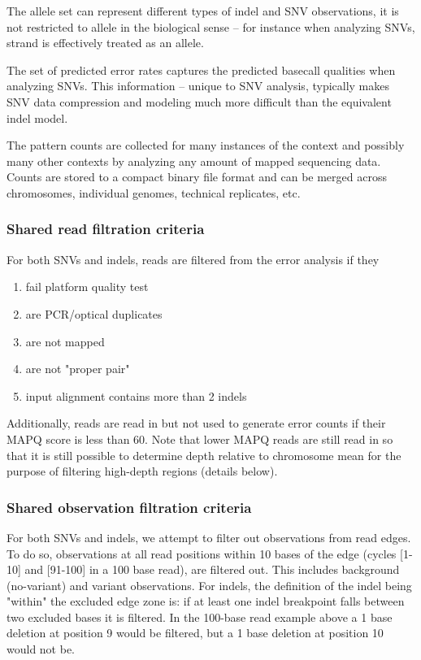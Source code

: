 \documentclass{article}
\begin{document}
The allele set can represent different types of indel and SNV observations, it is not restricted to allele in the biological sense -- for instance when analyzing SNVs, strand is effectively treated as an allele.

The set of predicted error rates captures the predicted basecall qualities when analyzing SNVs. This information -- unique to SNV analysis, typically makes SNV data compression and modeling much more difficult than the equivalent indel model.

The pattern counts are collected for many instances of the context and possibly many other contexts by analyzing any amount of mapped sequencing data. Counts are stored to a compact binary file format and can be merged across chromosomes, individual genomes, technical replicates, etc.

\subsubsection{Shared read filtration criteria}

For both SNVs and indels, reads are filtered from the error analysis if they

\begin{enumerate}
\item fail platform quality test
\item are PCR/optical duplicates
\item are not mapped
\item are not "proper pair"
\item input alignment contains more than 2 indels
\end{enumerate}

Additionally, reads are read in but not used to generate error counts if their MAPQ score is less than 60. Note that lower MAPQ reads are still read in so that it is still possible to determine depth relative to chromosome mean for the purpose of filtering high-depth regions (details below).

\subsubsection{Shared observation filtration criteria}

For both SNVs and indels, we attempt to filter out observations from read edges. To do so, observations at all read positions within 10 bases of the edge (cycles [1-10] and [91-100] in a 100 base read), are filtered out. This includes background (no-variant) and variant observations. For indels, the definition of the indel being "within" the excluded edge zone is: if at least one indel breakpoint falls between two excluded bases it is filtered. In the 100-base read example above a 1 base deletion at position 9 would be filtered, but a 1 base deletion at position 10 would not be.
\end{document}
